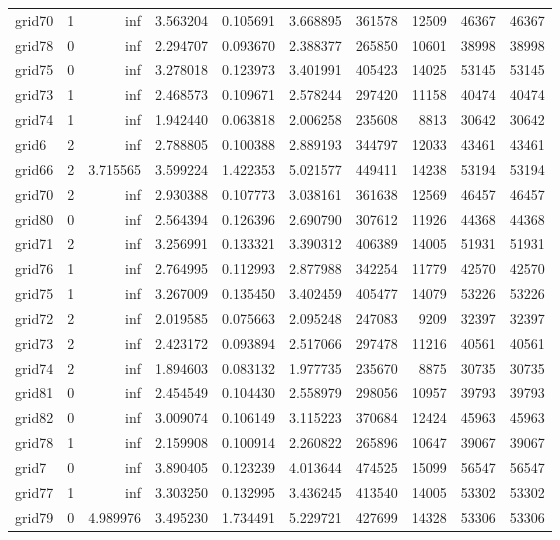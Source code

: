\documentclass[../../../thesis.tex]{subfiles}
\begin{document}
\begin{longtable}{|l|r|r|r|r|r|r|r|r|r|}
grid70 & 1 & inf & 3.563204 & 0.105691 & 3.668895 & 361578 & 12509 & 46367 & 46367 \\
grid78 & 0 & inf & 2.294707 & 0.093670 & 2.388377 & 265850 & 10601 & 38998 & 38998 \\
grid75 & 0 & inf & 3.278018 & 0.123973 & 3.401991 & 405423 & 14025 & 53145 & 53145 \\
grid73 & 1 & inf & 2.468573 & 0.109671 & 2.578244 & 297420 & 11158 & 40474 & 40474 \\
grid74 & 1 & inf & 1.942440 & 0.063818 & 2.006258 & 235608 & 8813 & 30642 & 30642 \\
grid6 & 2 & inf & 2.788805 & 0.100388 & 2.889193 & 344797 & 12033 & 43461 & 43461 \\
grid66 & 2 & 3.715565 & 3.599224 & 1.422353 & 5.021577 & 449411 & 14238 & 53194 & 53194 \\
grid70 & 2 & inf & 2.930388 & 0.107773 & 3.038161 & 361638 & 12569 & 46457 & 46457 \\
grid80 & 0 & inf & 2.564394 & 0.126396 & 2.690790 & 307612 & 11926 & 44368 & 44368 \\
grid71 & 2 & inf & 3.256991 & 0.133321 & 3.390312 & 406389 & 14005 & 51931 & 51931 \\
grid76 & 1 & inf & 2.764995 & 0.112993 & 2.877988 & 342254 & 11779 & 42570 & 42570 \\
grid75 & 1 & inf & 3.267009 & 0.135450 & 3.402459 & 405477 & 14079 & 53226 & 53226 \\
grid72 & 2 & inf & 2.019585 & 0.075663 & 2.095248 & 247083 & 9209 & 32397 & 32397 \\
grid73 & 2 & inf & 2.423172 & 0.093894 & 2.517066 & 297478 & 11216 & 40561 & 40561 \\
grid74 & 2 & inf & 1.894603 & 0.083132 & 1.977735 & 235670 & 8875 & 30735 & 30735 \\
grid81 & 0 & inf & 2.454549 & 0.104430 & 2.558979 & 298056 & 10957 & 39793 & 39793 \\
grid82 & 0 & inf & 3.009074 & 0.106149 & 3.115223 & 370684 & 12424 & 45963 & 45963 \\
grid78 & 1 & inf & 2.159908 & 0.100914 & 2.260822 & 265896 & 10647 & 39067 & 39067 \\
grid7 & 0 & inf & 3.890405 & 0.123239 & 4.013644 & 474525 & 15099 & 56547 & 56547 \\
grid77 & 1 & inf & 3.303250 & 0.132995 & 3.436245 & 413540 & 14005 & 53302 & 53302 \\
grid79 & 0 & 4.989976 & 3.495230 & 1.734491 & 5.229721 & 427699 & 14328 & 53306 & 53306 \\

\end{longtable}
\end{document}
